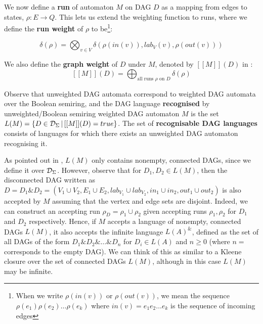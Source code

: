 \documentclass[11pt]{article}
\begin{document}
We now define a \textbf{run} of automaton $M$ on DAG $D$ as a mapping from edges
to states, $\rho: E \rightarrow Q$. This lets us extend the weighting function
to runs, where we define the \textbf{run weight} of $\rho$ to be\footnote{When
we write $\rho(in(v))$ or $\rho(out(v))$, we mean the sequence $\rho(e_1)
\rho(e_2)\ldots \rho(e_k)$ where $in(v) = e_1e_2\ldots e_k$ is the sequence of
incoming edges}:

\[
\delta(\rho) = \bigotimes_{v \in V} \delta(\rho(in(v)), lab_V(v), \rho(out(v)))
\]

We also define the \textbf{graph weight} of $D$ under $M$, denoted by $[[M]](D)$
in \cite{chiang2018weighted}:
\[[[M]](D) = \bigoplus_{\text{all runs $\rho$ on $D$}} \delta(\rho)\]

Observe that unweighted DAG automata correspond to weighted DAG automata over
the Boolean semiring, and the DAG language \textbf{recognised} by
unweighted/Boolean semiring weighted DAG automaton $M$ is the set $L(M) = \{D
\in \mathcal{D}_\Sigma \, | \, [[M]](D) = true\}$. The set of \textbf{recognisable DAG
languages} consists of languages for which there exists an unweighted DAG
automaton recognising it.

As pointed out in \cite{blum2019properties}, $L(M)$ only contains nonempty,
connected DAGs, since we define it over $\mathcal{D}_\Sigma$. However, observe that
for $D_1, D_2 \in L(M)$, then the disconnected DAG written as $D = D_1 \& D_2 =
(V_1 \cup V_2, E_1 \cup E_2, lab_{V_1} \cup lab_{V_2}, in_1 \cup in_2, out_1
\cup out_2)$ is also accepted by $M$ assuming that the vertex and edge sets are
disjoint. Indeed, we can construct an accepting run $\rho_D = \rho_1 \cup
\rho_2$ given accepting runs $\rho_1,\rho_2$ for $D_1$ and $D_2$ respectively.
Hence, if $M$ accepts a language of nonempty, connected DAGs $L(M)$, it also
accepts the infinite language $L(A)^\&$, defined as the set of all DAGs of the
form $D_1 \& D_2 \& \ldots \& D_n$ for $D_i \in L(A)$ and $n \ge 0$ (where $n=$
corresponds to the empty DAG). We can think of this as similar to a Kleene
closure over the set of connected DAGs $L(M)$, although in this case $L(M)$ may
be infinite.  
\end{document}
